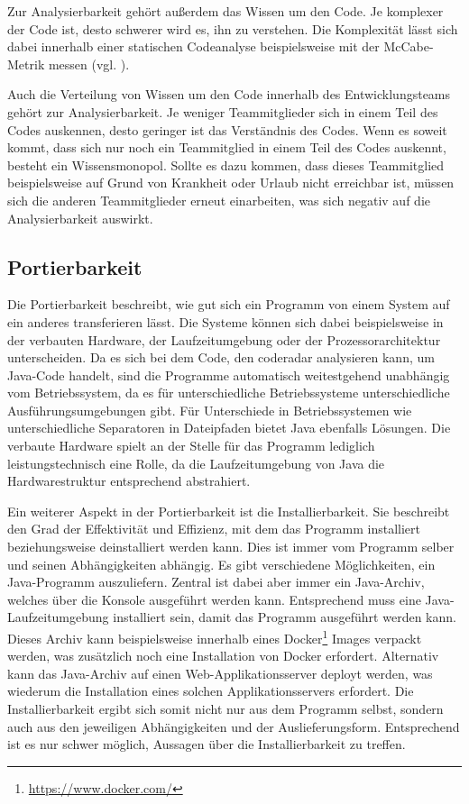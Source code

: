 \documentclass[
	oneside,  %
	ngerman, 
	final, 
	11pt, 
	a4paper, 
	1.1headlines, 
	headinclude=false, 
	footinclude=false, 
	mpinclude=false, 
	pagesize, 
	onecolumn, 
	titlepage, 
	parskip=half, 
	headsepline, 
	chapterprefix=false, 
	version=first, 
	listof=totoc, 
	bibliography=totoc, 
	toc=graduated, 
	fleqn
]{scrbook}
\begin{document}
Zur Analysierbarkeit gehört außerdem das Wissen um den Code.
Je komplexer der Code ist, desto schwerer wird es, ihn zu verstehen.
Die Komplexität lässt sich dabei innerhalb einer statischen Codeanalyse beispielsweise mit der McCabe-Metrik messen (vgl. \cite{MC1976}).

Auch die Verteilung von Wissen um den Code innerhalb des Entwicklungsteams gehört zur Analysierbarkeit.
Je weniger Teammitglieder sich in einem Teil des Codes auskennen, desto geringer ist das Verständnis des Codes.
Wenn es soweit kommt, dass sich nur noch ein Teammitglied in einem Teil des Codes auskennt, besteht ein Wissensmonopol.
Sollte es dazu kommen, dass dieses Teammitglied beispielsweise auf Grund von Krankheit oder Urlaub nicht erreichbar ist, müssen sich die anderen Teammitglieder erneut einarbeiten, was sich negativ auf die Analysierbarkeit auswirkt.

\subsection{Portierbarkeit}
Die Portierbarkeit beschreibt, wie gut sich ein Programm von einem System auf ein anderes transferieren lässt.
Die Systeme können sich dabei beispielsweise in der verbauten Hardware, der Laufzeitumgebung oder der Prozessorarchitektur unterscheiden.
Da es sich bei dem Code, den coderadar analysieren kann, um Java-Code handelt, sind die Programme automatisch weitestgehend unabhängig vom Betriebssystem, da es für unterschiedliche Betriebssysteme unterschiedliche Ausführungsumgebungen gibt.
Für Unterschiede in Betriebssystemen wie unterschiedliche Separatoren in Dateipfaden bietet Java ebenfalls Lösungen.
Die verbaute Hardware spielt an der Stelle für das Programm lediglich leistungstechnisch eine Rolle, da die Laufzeitumgebung von Java die Hardwarestruktur entsprechend abstrahiert.

Ein weiterer Aspekt in der Portierbarkeit ist die Installierbarkeit.
Sie beschreibt den Grad der Effektivität und Effizienz, mit dem das Programm installiert beziehungsweise deinstalliert werden kann.
Dies ist immer vom Programm selber und seinen Abhängigkeiten abhängig.
Es gibt verschiedene Möglichkeiten, ein Java-Programm auszuliefern.
Zentral ist dabei aber immer ein Java-Archiv, welches über die Konsole ausgeführt werden kann.
Entsprechend muss eine Java-Laufzeitumgebung installiert sein, damit das Programm ausgeführt werden kann.
Dieses Archiv kann beispielsweise innerhalb eines Docker\footnote{\url{https://www.docker.com/}} Images verpackt werden, was zusätzlich noch eine Installation von Docker erfordert.
Alternativ kann das Java-Archiv auf einen Web-Applikationsserver deployt werden, was wiederum die Installation eines solchen Applikationsservers erfordert.
Die Installierbarkeit ergibt sich somit nicht nur aus dem Programm selbst, sondern auch aus den jeweiligen Abhängigkeiten und der Auslieferungsform.
Entsprechend ist es nur schwer möglich, Aussagen über die Installierbarkeit zu treffen.
\end{document}
